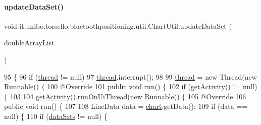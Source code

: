 \paragraph{\texorpdfstring{update\+Data\+Set()}{updateDataSet()}}
{\footnotesize\ttfamily void it.\+unibo.\+torsello.\+bluetoothpositioning.\+util.\+Chart\+Util.\+update\+Data\+Set (\begin{DoxyParamCaption}\item[{final Array\+List$<$ Double $>$}]{double\+Array\+List }\end{DoxyParamCaption})}


\begin{DoxyCode}
95                                                                        \{
96         \textcolor{keywordflow}{if} (\hyperlink{classit_1_1unibo_1_1torsello_1_1bluetoothpositioning_1_1util_1_1ChartUtil_ac73af861c9ca49e226fe1218cef6c572_ac73af861c9ca49e226fe1218cef6c572}{thread} != null)
97             \hyperlink{classit_1_1unibo_1_1torsello_1_1bluetoothpositioning_1_1util_1_1ChartUtil_ac73af861c9ca49e226fe1218cef6c572_ac73af861c9ca49e226fe1218cef6c572}{thread}.interrupt();
98 
99         \hyperlink{classit_1_1unibo_1_1torsello_1_1bluetoothpositioning_1_1util_1_1ChartUtil_ac73af861c9ca49e226fe1218cef6c572_ac73af861c9ca49e226fe1218cef6c572}{thread} = \textcolor{keyword}{new} Thread(\textcolor{keyword}{new} Runnable() \{
100             @Override
101             \textcolor{keyword}{public} \textcolor{keywordtype}{void} run() \{
102                 \textcolor{keywordflow}{if} (\hyperlink{classit_1_1unibo_1_1torsello_1_1bluetoothpositioning_1_1util_1_1ChartUtil_a59150a6d20b6d0ad2fcf8c1ba858d355_a59150a6d20b6d0ad2fcf8c1ba858d355}{getActivity}() != null) \{
103 
104                     \hyperlink{classit_1_1unibo_1_1torsello_1_1bluetoothpositioning_1_1util_1_1ChartUtil_a59150a6d20b6d0ad2fcf8c1ba858d355_a59150a6d20b6d0ad2fcf8c1ba858d355}{getActivity}().runOnUiThread(\textcolor{keyword}{new} Runnable() \{
105                         @Override
106                         \textcolor{keyword}{public} \textcolor{keywordtype}{void} run() \{
107 
108                             LineData data = \hyperlink{classit_1_1unibo_1_1torsello_1_1bluetoothpositioning_1_1util_1_1ChartUtil_a6c34176fdfb85bac1d3aa1529b49ad5f_a6c34176fdfb85bac1d3aa1529b49ad5f}{chart}.getData();
109                             \textcolor{keywordflow}{if} (data == null) \{
110                                 \textcolor{keywordflow}{if} (\hyperlink{classit_1_1unibo_1_1torsello_1_1bluetoothpositioning_1_1util_1_1ChartUtil_aa98bcaa2d5ba444b91cdc029768d380a_aa98bcaa2d5ba444b91cdc029768d380a}{dataSets} != null) \{

\end{DoxyCode}
